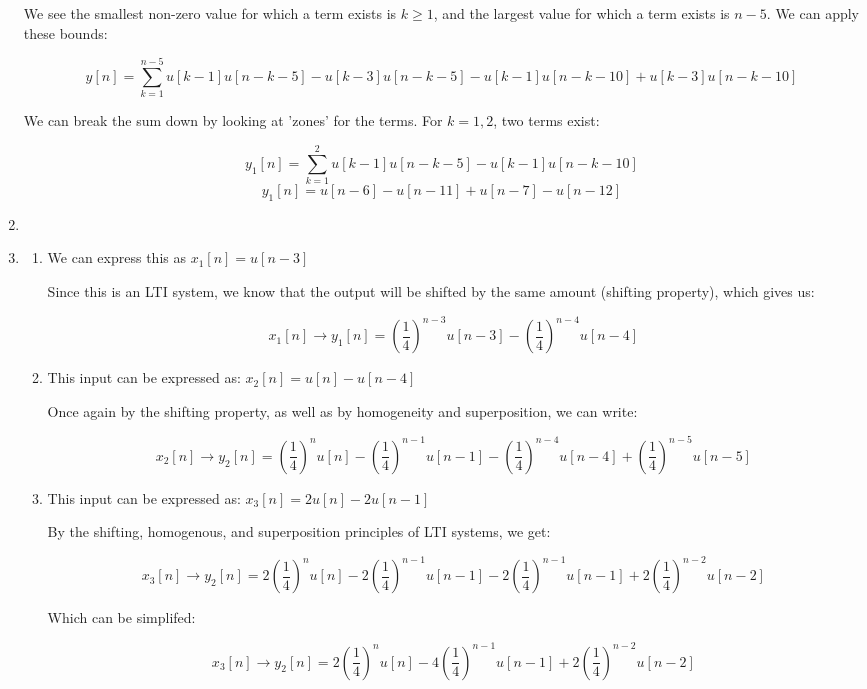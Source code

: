 \begin{enumerate}
    We see the smallest non-zero value for which a term exists is $k\geq 1$, and the largest value for which a term exists is $n-5$. We can apply these bounds:

    $$y[n]=\sum_{k=1}^{n-5} u[k-1]u[n-k-5]-u[k-3]u[n-k-5]-u[k-1]u[n-k-10]+u[k-3]u[n-k-10]$$

    We can break the sum down by looking at 'zones' for the terms. For $k=1,2$, two terms exist:

    $$y_1[n]=\sum_{k=1}^{2} u[k-1]u[n-k-5]-u[k-1]u[n-k-10]$$
    $$y_1[n]= u[n-6]-u[n-11]+u[n-7]-u[n-12]$$

  \item

  \item

    \begin{enumerate}

      \item We can express this as $x_1[n]=u[n-3]$

        Since this is an LTI system, we know that the output will be shifted by the same amount (shifting property), which gives us:

        $$\boxed{x_1[n]\to y_1[n]=\left( \frac{1}{4} \right)^{n-3}u[n-3]-\left( \frac{1}{4} \right)^{n-4}u[n-4]}$$

      \item This input can be expressed as: $x_2[n]=u[n]-u[n-4]$

        Once again by the shifting property, as well as by homogeneity and superposition, we can write:

        $$\boxed{x_2[n]\to y_2[n]=\left( \frac{1}{4} \right)^{n}u[n]-\left( \frac{1}{4} \right)^{n-1}u[n-1]-\left( \frac{1}{4} \right)^{n-4}u[n-4]+\left( \frac{1}{4} \right)^{n-5}u[n-5]}$$

      \item This input can be expressed as: $x_3[n]=2u[n]-2u[n-1]$

        By the shifting, homogenous, and superposition principles of LTI systems, we get:

        $$x_3[n]\to y_2[n]=2\left( \frac{1}{4} \right)^{n}u[n]-2\left( \frac{1}{4} \right)^{n-1}u[n-1]-2\left( \frac{1}{4} \right)^{n-1}u[n-1]+2\left( \frac{1}{4} \right)^{n-2}u[n-2]$$

        Which can be simplifed:

        $$\boxed{x_3[n]\to y_2[n]=2\left( \frac{1}{4} \right)^{n}u[n]-4\left( \frac{1}{4} \right)^{n-1}u[n-1]+2\left( \frac{1}{4} \right)^{n-2}u[n-2]}$$


\end{enumerate}
\end{enumerate}
